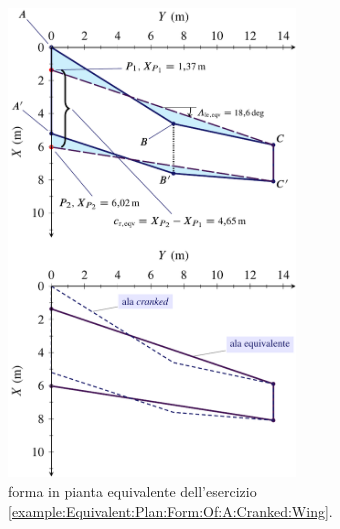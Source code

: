 \documentclass[[12pt,twoside]{book}
\begin{document}
\begin{figure}[t]%
  \centering
    \includegraphics[width=0.68\textwidth]{Chapter_2/equivalent_plan_form_of_a_cranked_wing/wing_planform_basic_3_drawing.pdf}
  \caption{
           forma in pianta equivalente dell'esercizio \ref{example:Equivalent:Plan:Form:Of:A:Cranked:Wing}.
  }
  \label{fig:Cranked:Wing:Planform:Results:B}%
\end{figure}
%

%
\end{document}
